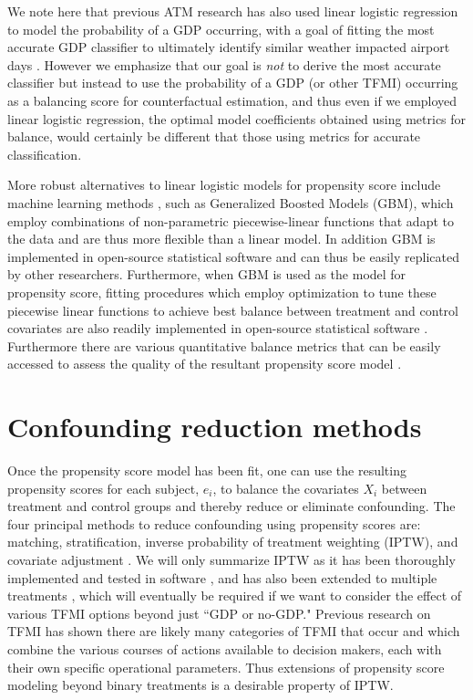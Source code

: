 \documentclass[11pt]{scrartcl}
\begin{document}
We note here that previous ATM research has also used linear logistic regression to model the probability of a GDP occurring, with a goal of fitting the most accurate GDP classifier to ultimately identify similar weather impacted airport days \cite{Grabbe:2014aa}.  However we emphasize that our goal is \emph{not} to derive the most accurate classifier but instead to use the probability of a GDP (or other TFMI) occurring as a balancing score for counterfactual estimation, and thus even if we employed linear logistic regression, the optimal model coefficients obtained using metrics for balance, would certainly be different that those using metrics for accurate classification.

More robust alternatives to linear logistic models for propensity score include machine learning methods \cite{lee2010improving}, such as Generalized Boosted Models (GBM), which employ combinations of non-parametric piecewise-linear functions that adapt to the data and are thus more flexible than a linear model.  In addition GBM is implemented in open-source statistical software \cite{ridgeway2006gbm} and can thus be easily replicated by other researchers.  Furthermore, when GBM is used as the model for propensity score, fitting procedures which employ optimization to tune these piecewise linear functions to achieve best balance between treatment and control covariates are also readily implemented in open-source statistical software \cite{ridgeway2015toolkit}.  Furthermore there are various quantitative balance metrics that can be easily accessed to assess the quality of the resultant propensity score model \cite{ridgeway2015toolkit}. 

\section*{Confounding reduction methods}
Once the propensity score model has been fit, one can use the resulting propensity scores for each subject, $e_i$, to balance the covariates $X_i$ between treatment and control groups and thereby reduce or eliminate confounding.  The four principal methods to reduce confounding using propensity scores are: matching, stratification, inverse probability of treatment weighting (IPTW), and covariate adjustment \cite{austin2011introduction}.  We will only summarize IPTW as it has been thoroughly implemented and tested in software \cite{ridgeway2015toolkit}, and has also been extended to multiple treatments \cite{mccaffrey2013tutorial}, which will eventually be required if we want to consider the effect of various TFMI options beyond just ``GDP or no-GDP."  Previous research on TFMI \cite{tfmiCluster} has shown there are likely many categories of TFMI that occur and which combine the various courses of actions available to decision makers, each with their own specific operational parameters. Thus extensions of propensity score modeling beyond binary treatments is a desirable property of IPTW.
\end{document}
